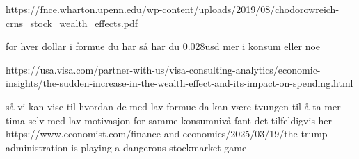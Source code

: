 \documentclass[
  12pt,
  a4paper,
  DIV=11,
  numbers=noendperiod]{scrartcl}
\begin{document}
https://fnce.wharton.upenn.edu/wp-content/uploads/2019/08/chodorowreich-crns\_stock\_wealth\_effects.pdf

for hver dollar i formue du har så har du 0.028usd mer i konsum eller
noe

https://usa.visa.com/partner-with-us/visa-consulting-analytics/economic-insights/the-sudden-increase-in-the-wealth-effect-and-its-impact-on-spending.html

så vi kan vise til hvordan de med lav formue da kan være tvungen til å
ta mer tima selv med lav motivasjon for samme konsumnivå fant det
tilfeldigvis her
https://www.economist.com/finance-and-economics/2025/03/19/the-trump-administration-is-playing-a-dangerous-stockmarket-game
\end{document}
